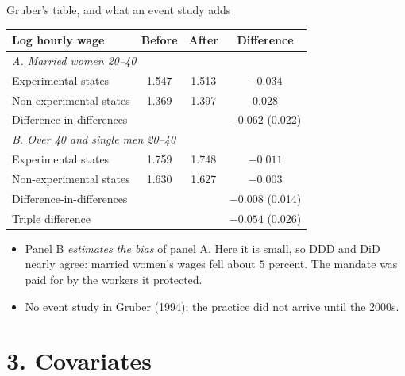 \documentclass[
  11pt,
  ignorenonframetext,
  aspectratio=169,
]{beamer}
\providecommand{\tightlist}{%
  \setlength{\itemsep}{0pt}\setlength{\parskip}{0pt}}
\begin{document}
\begin{frame}{Gruber's table, and what an event study adds}
\protect{}\label{grubers-table-and-what-an-event-study-adds}
\begin{center}\scriptsize
\begin{tabular}{lccc}
\toprule
Log hourly wage & Before & After & Difference \\
\midrule
\multicolumn{4}{l}{\emph{A. Married women 20--40}} \\
Experimental states & 1.547 & 1.513 & $-0.034$ \\
Non-experimental states & 1.369 & 1.397 & $0.028$ \\
Difference-in-differences & & & $\mathbf{-0.062}$ (0.022) \\
\midrule
\multicolumn{4}{l}{\emph{B. Over 40 and single men 20--40}} \\
Experimental states & 1.759 & 1.748 & $-0.011$ \\
Non-experimental states & 1.630 & 1.627 & $-0.003$ \\
Difference-in-differences & & & $\mathbf{-0.008}$ (0.014) \\
\midrule
Triple difference & & & $\mathbf{-0.054}$ (0.026) \\
\bottomrule
\end{tabular}
\end{center}

\begin{itemize}
\tightlist
\item
  Panel B \emph{estimates the bias} of panel A. Here it is small, so DDD
  and DiD nearly agree: married women's wages fell about \(5\) percent.
  The mandate was paid for by the workers it protected.
\item
  No event study in Gruber (1994); the practice did not arrive until the
  2000s.
\end{itemize}
\end{frame}

\section{3. Covariates}\label{covariates}
\end{document}
